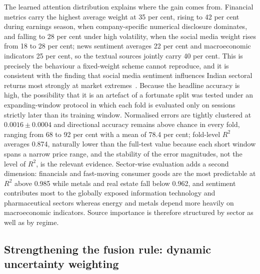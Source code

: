 The learned attention distribution explains where the gain comes from. Financial metrics carry
the highest average weight at 35 per cent, rising to 42 per cent during earnings season, when
company-specific numerical disclosure dominates, and falling to 28 per cent under high
volatility, when the social media weight rises from 18 to 28 per cent; news sentiment averages
22 per cent and macroeconomic indicators 25 per cent, so the textual sources jointly carry 40
per cent. This is precisely the behaviour a fixed-weight scheme cannot reproduce, and it is
consistent with the finding that social media sentiment influences Indian sectoral returns most
strongly at market extremes~\cite{khan2025asymmetric}. Because the headline accuracy is high,
the possibility that it is an artefact of a fortunate split was tested under an expanding-window
protocol in which each fold is evaluated only on sessions strictly later than its training
window. Normalised errors are tightly clustered at $0.0016 \pm 0.0004$ and directional accuracy
remains above chance in every fold, ranging from 68 to 92 per cent with a mean of 78.4 per cent;
fold-level $R^2$ averages 0.874, naturally lower than the full-test value because each short
window spans a narrow price range, and the stability of the error magnitudes, not the level of
$R^2$, is the relevant evidence. Sector-wise evaluation adds a second dimension: financials and
fast-moving consumer goods are the most predictable at $R^2$ above 0.985 while metals and real
estate fall below 0.962, and sentiment contributes most to the globally exposed information
technology and pharmaceutical sectors whereas energy and metals depend more heavily on
macroeconomic indicators. Source importance is therefore structured by sector as well as by
regime.

\subsection{Strengthening the fusion rule: dynamic uncertainty weighting}

